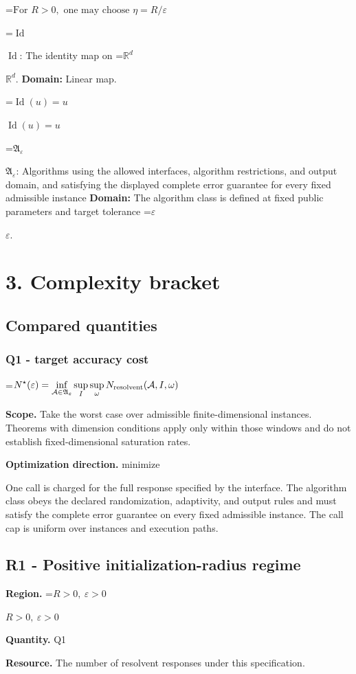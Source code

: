 \documentclass[10pt,a4paper]{article}
\newcommand{\AtlasMath}[1]{\par\begingroup\centering\setbox0=\hbox{$\displaystyle #1$}\ifdim\wd0>1.4\linewidth\typeout{ATLAS WIDE FORMULA: \the\wd0}\fi\ifdim\wd0>\linewidth\resizebox{\linewidth}{!}{\box0}\else\box0\fi\par\endgroup}
\newcommand{\AtlasInlineMath}[1]{\begingroup\setbox0=\hbox{$#1$}\ifdim\wd0>.4\linewidth\endgroup\AtlasMath{#1}\else\endgroup$#1$\fi}
\begin{document}
\AtlasMath{\text{For }R>0,\text{ one may choose }\eta=R/\varepsilon}
\AtlasInlineMath{\operatorname{Id}}: The identity map on \AtlasInlineMath{\mathbb R^d}. \textbf{Domain:} Linear map.

\AtlasInlineMath{\operatorname{Id}(u)=u}

\AtlasInlineMath{\mathfrak A_\varepsilon}: Algorithms using the allowed interfaces, algorithm restrictions, and output domain, and satisfying the displayed complete error guarantee for every fixed admissible instance \textbf{Domain:} The algorithm class is defined at fixed public parameters and target tolerance \AtlasInlineMath{\varepsilon}.

\section{3. Complexity bracket}
\subsection{Compared quantities}
\subsubsection{Q1 - target accuracy cost}
\AtlasMath{N^\star(\varepsilon)=\inf_{\mathcal A\in\mathfrak A_\varepsilon}\sup_I \sup_\omega N_{\rm resolvent}(\mathcal A,I,\omega)}
\textbf{Scope.} Take the worst case over admissible finite-dimensional instances. Theorems with dimension conditions apply only within those windows and do not establish fixed-dimensional saturation rates.

\textbf{Optimization direction.} minimize

One call is charged for the full response specified by the interface. The algorithm class obeys the declared randomization, adaptivity, and output rules and must satisfy the complete error guarantee on every fixed admissible instance. The call cap is uniform over instances and execution paths.

\subsection{R1 - Positive initialization-radius regime}
\textbf{Region.} \AtlasInlineMath{R>0,\ \varepsilon>0}

\textbf{Quantity.} Q1

\textbf{Resource.} The number of resolvent responses under this specification.
\end{document}

